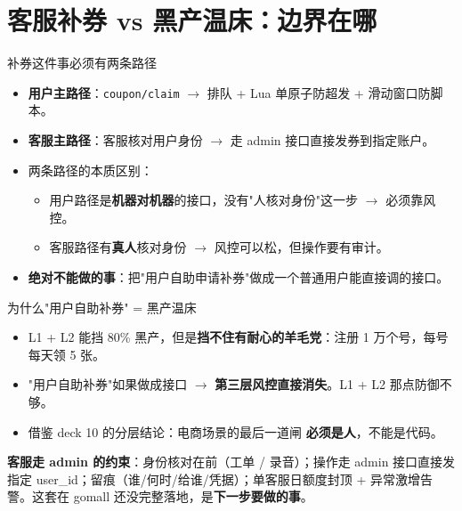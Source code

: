 \section{客服补券 vs 黑产温床：边界在哪}

\begin{frame}{补券这件事必须有两条路径}
\begin{itemize}
  \item \textbf{用户主路径}：\texttt{coupon/claim} $\to$ 排队 + Lua 单原子防超发 + 滑动窗口防脚本。
  \item \textbf{客服主路径}：客服核对用户身份 $\to$ 走 admin 接口直接发券到指定账户。
  \item 两条路径的本质区别：
  \begin{itemize}
    \item 用户路径是\textbf{机器对机器}的接口，没有"人核对身份"这一步 $\to$ 必须靠风控。
    \item 客服路径有\textbf{真人}核对身份 $\to$ 风控可以松，但操作要有审计。
  \end{itemize}
  \item \textbf{绝对不能做的事}：把"用户自助申请补券"做成一个普通用户能直接调的接口。
\end{itemize}
\end{frame}

\begin{frame}{为什么"用户自助补券" = 黑产温床}
\vspace{3mm}
\begin{itemize}
  \item L1 + L2 能挡 80\% 黑产，但是\textbf{挡不住有耐心的羊毛党}：注册 1 万个号，每号每天领 5 张。
  \item "用户自助补券"如果做成接口 $\to$ \textbf{第三层风控直接消失}。L1 + L2 那点防御不够。
  \item 借鉴 deck 10 的分层结论：电商场景的最后一道闸 \textbf{必须是人}，不能是代码。
\end{itemize}
\vspace{1mm}
\small \textbf{客服走 admin 的约束}：身份核对在前（工单 / 录音）；操作走 admin 接口直接发指定 user\_id；留痕（谁/何时/给谁/凭据）；单客服日额度封顶 + 异常激增告警。这套在 gomall 还没完整落地，是\textbf{下一步要做的事}。
\end{frame}


